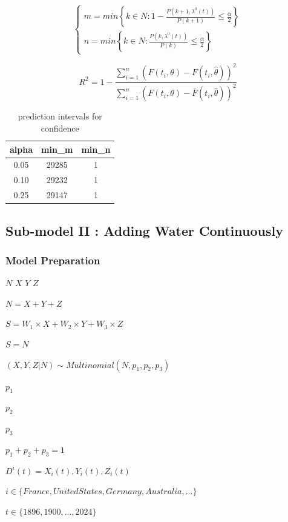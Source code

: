 \documentclass{mcmthesis}
\begin{document}
\begin{equation}
\left\{\begin{array}{l}
m = min\left\{ k\in N: 1 - \frac{P(k + 1, \lambda ^{0}(t))}{P(k + 1)} \leq \frac{\alpha }{2}\right\}\\n = min\left\{ k\in N: \frac{P(k, \lambda ^{0}(t))}{P(k)} \leq \frac{\alpha }{2}\right\}
\end{array}\right.
\end{equation}

\begin{equation}
R^{2} = 1 - \frac{\sum_{i = 1}^{n}(F(t_{i}, \theta ) - F(t_{i}, \hat{\theta }))^2}{\sum_{i = 1}^{n}(F(t_{i}, \theta ) - \bar{F}(t_{i}, \hat{\theta }))^2}
\end{equation}


\begin{table}
\centering
\caption{prediction intervals for confidence}
\begin{tabular}{ccc} 
\toprule
alpha & min\_m & min\_n  \\ 
\toprule
0.05  & 29285  & 1       \\
0.10  & 29232  & 1       \\
0.25  & 29147  & 1       \\
\toprule
\end{tabular}
\end{table}

\subsection{Sub-model II : Adding Water Continuously}
\subsubsection{Model Preparation}
$N$ $X$ $Y$ $Z$

$N=X+Y+Z$

$S=W_{1}\times X+W_{2}\times Y+W_{3}\times Z$

$S=N$

$(X, Y, Z|N)\sim Multinomial(N, p_{1}, p_{2}, p_{3})$

$p_{1}$

$p_{2}$

$p_{3}$

$p_{1}+p_{2}+p_{3}=1$

$D^i(t)={X_{i}(t), Y_{i}(t), Z_{i}(t)}$

$i\in \{France, United States, Germany, Australia, ...\}$

$t\in \{1896, 1900, ...,2024\}$
\end{document}
